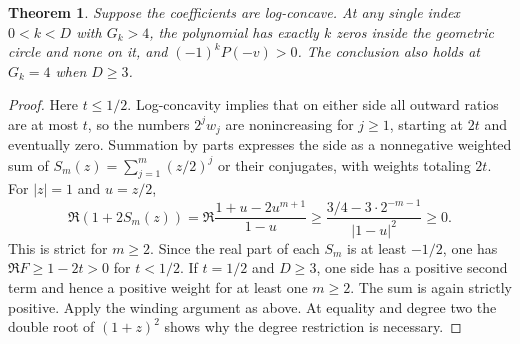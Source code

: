 \documentclass[11pt]{article}
\newtheorem{theorem}{Theorem}
\begin{document}
\begin{theorem}\label{four}
Suppose the coefficients are log-concave. At any single index $0<k<D$ with $G_k>4$, the polynomial has exactly $k$ zeros inside the geometric circle and none on it, and $(-1)^kP(-v)>0$. The conclusion also holds at $G_k=4$ when $D\ge3$.
\end{theorem}
\begin{proof}
Here $t\le1/2$. Log-concavity implies that on either side all outward ratios are at most $t$, so the numbers $2^jw_j$ are nonincreasing for $j\ge1$, starting at $2t$ and eventually zero. Summation by parts expresses the side as a nonnegative weighted sum of $S_m(z)=\sum_{j=1}^m(z/2)^j$ or their conjugates, with weights totaling $2t$. For $|z|=1$ and $u=z/2$,
\[
 \Re(1+2S_m(z))=\Re\frac{1+u-2u^{m+1}}{1-u}
 \ge\frac{3/4-3\cdot 2^{-m-1}}{|1-u|^2}\ge0.
\]
This is strict for $m\ge2$. Since the real part of each $S_m$ is at least $-1/2$, one has $\Re F\ge1-2t>0$ for $t<1/2$. If $t=1/2$ and $D\ge3$, one side has a positive second term and hence a positive weight for at least one $m\ge2$. The sum is again strictly positive. Apply the winding argument as above. At equality and degree two the double root of $(1+z)^2$ shows why the degree restriction is necessary.
\end{proof}
\end{document}
